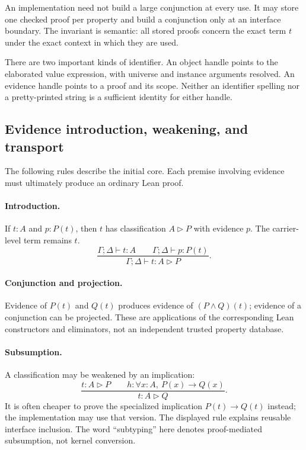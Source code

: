 \documentclass[11pt,letterpaper]{article}
\newcommand{\view}[2]{#1\mathbin{\triangleright}#2}
\theoremstyle{definition}
\theoremstyle{remark}
\begin{document}
An implementation need not build a large conjunction at every use. It may store
one checked proof per property and build a conjunction only at an interface
boundary. The invariant is semantic: all stored proofs concern the exact term
$t$ under the exact context in which they are used.

There are two important kinds of identifier. An object handle points to the
elaborated value expression, with universe and instance arguments resolved. An
evidence handle points to a proof and its scope. Neither an identifier spelling
nor a pretty-printed string is a sufficient identity for either handle.

\subsection{Evidence introduction, weakening, and transport}
The following rules describe the initial core. Each premise involving evidence
must ultimately produce an ordinary Lean proof.

\paragraph{Introduction.}
If $t:A$ and $p:P(t)$, then $t$ has classification $\view{A}{P}$ with evidence
$p$. The carrier-level term remains $t$.
\[
\frac{\Gamma;\Delta\vdash t:A\qquad
      \Gamma;\Delta\vdash p:P(t)}
     {\Gamma;\Delta\vdash t:\view{A}{P}}.
\tag{R-Intro}
\]

\paragraph{Conjunction and projection.}
Evidence of $P(t)$ and $Q(t)$ produces evidence of $(P\land Q)(t)$; evidence of a
conjunction can be projected. These are applications of the corresponding Lean
constructors and eliminators, not an independent trusted property database.

\paragraph{Subsumption.}
A classification may be weakened by an implication:
\[
\frac{t:\view{A}{P}\qquad h:\forall x:A,\ P(x)\to Q(x)}
     {t:\view{A}{Q}}.
\tag{R-Sub}
\]
It is often cheaper to prove the specialized implication $P(t)\to Q(t)$ instead;
the implementation may use that version. The displayed rule explains reusable
interface inclusion. The word ``subtyping'' here denotes proof-mediated
subsumption, not kernel conversion.
\end{document}
